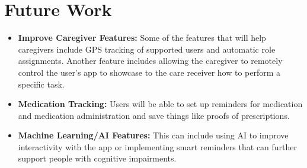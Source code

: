 \documentclass[12pt]{article}
\begin{document}
\section{Future Work}
\begin{itemize}
    \item \textbf{Improve Caregiver Features:} Some of the features that will help caregivers include GPS tracking of supported users and automatic role assignments. Another feature includes allowing the caregiver to remotely control the user’s app to showcase to the care receiver how to perform a specific task.
    \item \textbf{Medication Tracking:} Users will be able to set up reminders for medication and medication administration and save things like proofs of prescriptions.
    \item \textbf{Machine Learning/AI Features:} This can include using AI to improve interactivity with the app or implementing smart reminders that can further support people with cognitive impairments.
\end{itemize}
\end{document}
